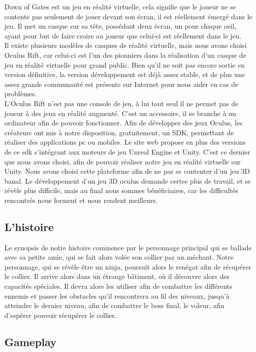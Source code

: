 \documentclass[12pt]{article}
\begin{document}
Dawn of Gates est un jeu en réalité virtuelle, cela signifie que le joueur ne se contente pas seulement de jouer devant son écran, il est réellement émergé dans le jeu. Il met un casque sur sa tête, possédant deux écran, un pour chaque oeil, ayant pour but de faire croire au joueur que celui-ci est réellement dans le jeu.\\
Il existe plusieurs modèles de casques de réalité virtuelle, mais nous avons choisi Oculus Rift, car celui-ci est l'un des pionniers dans la réalisation d'un casque de jeu en réalité virtuelle pour grand public. Bien qu'il ne soit pas encore sortie en version définitive, la version développement est déjà assez stable, et de plus une assez grande communauté est présente sur Internet pour nous aider en cas de problèmes.\\
L'Oculus Rift n'est pas une console de jeu, à lui tout seul il ne permet pas de joueur à des jeux en réalité augmenté. C'est un accessoire, il se branche à un ordinateur afin de pouvoir fonctionner. Afin de développer des jeux Oculus, les créateurs ont mis à notre disposition, gratuitement, un SDK, permettant de réaliser des applications pc ou mobiles. Le site web propose en plus des versions de ce sdk s'intégrant aux moteurs de jeu Unreal Engine et Unity. C'est ce dernier que nous avons choisi, afin de pouvoir réaliser notre jeu en réalité virtuelle sur Unity.
Nous avons choisi cette plateforme afin de ne pas se contenter d'un jeu 3D banal. Le développement d'un jeu 3D oculus demande certes plus de travail, et se révèle plus difficile, mais au final nous sommes bénéficiaires, car les difficultés rencontrés nous forment et nous rendent meilleurs.

\subsection{L'histoire}

Le synopsis de notre histoire commence par le personnage principal qui se ballade avec sa petite amie, qui se fait alors volée son collier par un méchant. Notre personnage, qui se révèle être un ninja, poursuit alors le renégat afin de récupérer le collier. Il arrive alors dans un étrange bâtiment, où il découvre alors des capacités spéciales. Il devra alors les utiliser afin de combattre les différents ennemis et passer les obstacles qu'il rencontrera au fil des niveaux, jusqu'à atteindre le dernier niveau, afin de combattre le boss final, le voleur, afin d'espérer pouvoir récupérer le collier.

\subsection{Gameplay}
\end{document}
